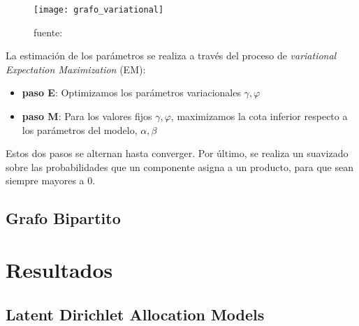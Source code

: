 \documentclass[class=article, crop=false]{standalone}
\begin{document}
\begin{figure}[h]
	\centering	
	\texttt{[image: grafo\_variational]}
	\caption{fuente: \cite{blei2003latent}}
	\label{fig:grafo_variational}
\end{figure}


La estimación de los parámetros se realiza a través del proceso de \emph{variational Expectation Maximization} (EM):

\begin{itemize}
\item \textbf{paso E}: Optimizamos los parámetros variacionales $\gamma, \varphi$
\item \textbf{paso M}: Para los valores fijos $\gamma, \varphi$, maximizamos la cota inferior respecto a los parámetros del modelo, $\alpha,\beta$
\end{itemize}

Estos dos pasos se alternan hasta converger. Por último, se realiza un suavizado sobre las probabilidades que un componente asigna a un producto, para que sean siempre mayores a 0.



\subsection{Grafo Bipartito}

\section{Resultados}

\subsection{Latent Dirichlet Allocation Models}
\end{document}
